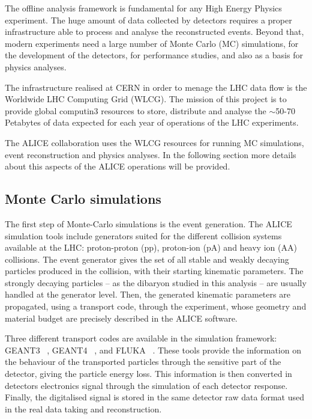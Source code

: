The offline analysis framework is fundamental for any High Energy Physics experiment.
The huge amount of data collected by detectors requires a proper infrastructure able to process and 
analyse the reconstructed events.
Beyond that, modern experiments need a large number of Monte Carlo (MC) simulations, for the development of
the detectors, for performance studies, and also as a basis for physics analyses.

The infrastructure realised at CERN in order to menage the LHC data flow is the Worldwide 
LHC Computing Grid (WLCG). The mission of this project is to provide global 
computin3 resources to store, distribute and analyse the $\sim$50-70 Petabytes of data expected for each
year of operations of the LHC experiments.

The ALICE collaboration uses the WLCG resources for running MC simulations, event reconstruction and physics
analyses. In the following section more details about this aspects of the ALICE operations will be 
provided.

%
\subsection{Monte Carlo simulations} \label{sec:montecarlo}

The first step of Monte-Carlo simulations is the event generation. 
The ALICE simulation tools include generators suited for the different collision systems available at the
LHC: proton-proton (pp), proton-ion (pA) and heavy ion (AA) collisions.
The event generator gives the set of all stable and weakly decaying particles produced in the collision,
with their starting kinematic parameters. The strongly decaying particles -- as the \dst dibaryon studied
in this analysis -- are usually handled at the generator level.
Then, the generated kinematic parameters are propagated, using a transport code, through the
experiment, whose geometry and material budget are precisely described in the ALICE software.

Three different transport codes are available in the simulation framework: GEANT3 ~\cite{geant3},
GEANT4 ~\cite{geant4}, and FLUKA ~\cite{fluka1,fluka2}.
These tools provide the information on the behaviour of the transported particles through the sensitive
part of the detector, giving the particle energy loss. 
This information is then converted in detectors electronics signal through the simulation of each detector
response. Finally, the digitalised signal is stored in the same detector raw data format used in the 
real data taking and reconstruction.

